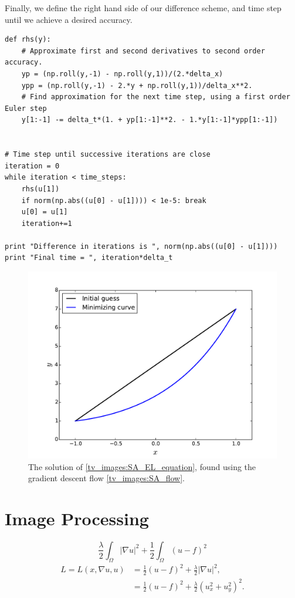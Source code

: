 Finally, we define the right hand side of our difference scheme, and time step until we 
achieve a desired accuracy. 
\begin{lstlisting}
def rhs(y):
	# Approximate first and second derivatives to second order accuracy.
	yp = (np.roll(y,-1) - np.roll(y,1))/(2.*delta_x)
	ypp = (np.roll(y,-1) - 2.*y + np.roll(y,1))/delta_x**2.
	# Find approximation for the next time step, using a first order Euler step
	y[1:-1] -= delta_t*(1. + yp[1:-1]**2. - 1.*y[1:-1]*ypp[1:-1])


# Time step until successive iterations are close
iteration = 0
while iteration < time_steps:
	rhs(u[1])
	if norm(np.abs((u[0] - u[1]))) < 1e-5: break
	u[0] = u[1]
	iteration+=1

print "Difference in iterations is ", norm(np.abs((u[0] - u[1])))
print "Final time = ", iteration*delta_t
\end{lstlisting}

\begin{figure}
\centering
\includegraphics[width=\textwidth]{min_surface_area.pdf}
\caption{The solution of \eqref{tv_images:SA_EL_equation}, found using the gradient descent flow \eqref{tv_images:SA_flow}.}
\label{fig:tv_images:SA_image}
\end{figure}


\section*{Image Processing}
\[
\frac{\lambda}{2} \int_{\Omega} | \nabla u |^2 + \frac{1}{2} \int_{\Omega}(u - f)^2
\]
\begin{align*}
L = L(x,\nabla u, u) &= \frac{1}{2}(u-f)^2 + \frac{\lambda}{2} | \nabla u|^2,\\
&= \frac{1}{2}(u-f)^2 + \frac{\lambda}{2} (u_x^2 + u_y^2)^2.
\end{align*}







